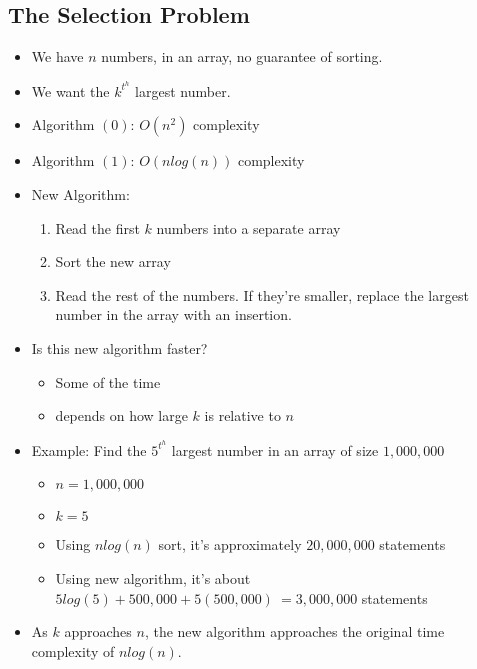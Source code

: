 \documentclass{article}
\begin{document}
\subsection*{The Selection Problem}

\begin{itemize}

    \item We have $n$ numbers, in an array, no guarantee of sorting. 

    \item We want the $k^t^h$ largest number.

    \item Algorithm $(0)$: $O(n^2)$ complexity

    \item Algorithm $(1)$: $O(nlog(n))$ complexity

    \item New Algorithm:
    \begin{enumerate}
        \item Read the first $k$ numbers into a separate array
        \item Sort the new array
        \item Read the rest of the numbers. If they're smaller, replace the largest number in the array with an insertion.
    \end{enumerate}

    \item Is this new algorithm faster?
    \begin{itemize}
        \item Some of the time
        \item depends on how large $k$ is relative to $n$
    \end{itemize}

    \item Example: Find the $5^t^h$ largest number in an array of size $1,000,000$
    \begin{itemize}
        \item $n = 1,000,000$
        \item $k = 5$
        \item Using $nlog(n)$ sort, it's approximately $20,000,000$ statements
        \item Using new algorithm, it's about $5log(5) + 500,000 + 5(500,000) ~= 3,000,000$ statements
    \end{itemize}

    \item As $k$ approaches $n$, the new algorithm approaches the original time complexity of $nlog(n)$.

\end{itemize}
\end{document}
